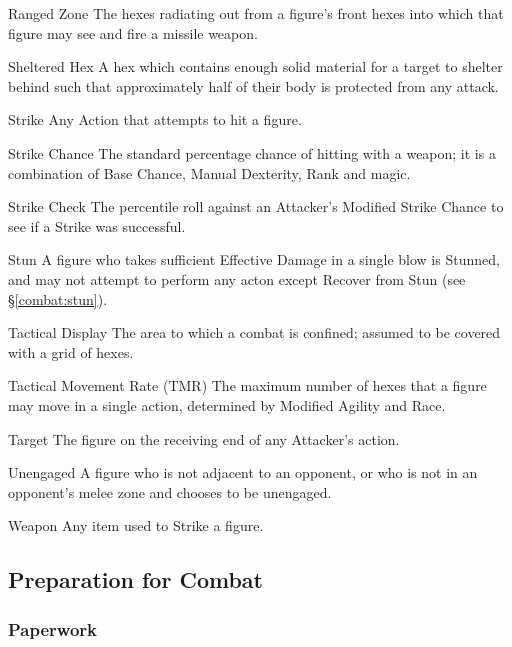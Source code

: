 \begin{multicols*}{3}
\begin{Description}
\item[Ranged Zone] The hexes radiating out from a figure's front hexes into
which that figure may see and fire a missile weapon.

\item[Sheltered Hex] A hex which contains enough solid material for a target
to shelter behind such that approximately half of their body is
protected from any attack.

\item[Strike] Any Action that attempts to hit a figure.

\item[Strike Chance] The standard percentage chance of hitting with a
weapon; it is a combination of Base Chance, Manual Dexterity, Rank and
magic.

\item[Strike Check] The percentile roll against an Attacker's Modified
Strike Chance to see if a Strike was successful.

\item[Stun] A figure who takes sufficient Effective Damage in a single blow
is Stunned, and may not attempt to perform any acton except Recover
from Stun (see \S\ref{combat:stun}).

\item[Tactical Display] The area to which a combat is confined; assumed to
be covered with a grid of hexes.

\item[Tactical Movement Rate (TMR)] The maximum num\-ber of hexes that a
figure may move in a single action, determined by Modified Agility and
Race.

\item[Target] The figure on the receiving end of any Attacker's action.

\item[Unengaged] A figure who is not adjacent to an opponent, or who is not
in an opponent's melee zone and chooses to be unengaged.

\item[Weapon] Any item used to Strike a figure.

\end{Description}

\subsection{Preparation for Combat}

\subsubsection{Paperwork}


\end{multicols*}
